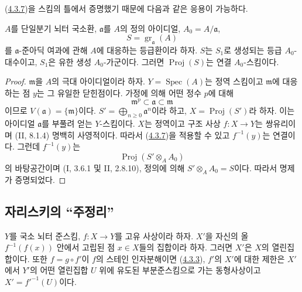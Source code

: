 (\hyperref[III.4.3.7-fr]{4.3.7})을 스킴의 틀에서 증명했기 때문에
다음과 같은 응용이 가능하다.

\begin{proposition}[4.3.13]
\label{III.4.3.13-fr}
$A$를 단일분기 뇌터 국소환, $\mathfrak a$를 $A$의 정의 아이디얼,
$A_0=A/\mathfrak a$,
\[
S=\operatorname{gr}_{\mathfrak a}(A)
\]
를 $\mathfrak a$-준아딕 여과에 관해 $A$에 대응하는 등급환이라 하자.
$S$는 $S_1$로 생성되는 등급 $A_0$-대수이고, $S_1$은 유한 생성
$A_0$-가군이다. 그러면 $\operatorname{Proj}(S)$는 연결
$A_0$-스킴이다.
\end{proposition}

\begin{proof}
$\mathfrak m$을 $A$의 극대 아이디얼이라 하자.
$Y=\operatorname{Spec}(A)$는 정역 스킴이고 $\mathfrak m$에 대응하는
점 $y$는 그 유일한 닫힌점이다. 가정에 의해 어떤 정수 $p$에 대해
\[
\mathfrak m^p\subset\mathfrak a\subset\mathfrak m
\]
이므로 $V(\mathfrak a)=\{\mathfrak m\}$이다.
$S'=\bigoplus_{n\geq0}\mathfrak a^n$이라 하고,
$X=\operatorname{Proj}(S')$라 하자. 이는 아이디얼 $\mathfrak a$를
부풀려 얻는 $Y$-스킴이다. $X$는 정역이고 구조 사상 $f:X\to Y$는
쌍유리이며 (II, 8.1.4) 명백히 사영적이다. 따라서
(\hyperref[III.4.3.7-fr]{4.3.7})을 적용할 수 있고
$f^{-1}(y)$는 연결이다. 그런데 $f^{-1}(y)$는
\[
\operatorname{Proj}(S'\otimes_AA_0)
\]
의 바탕공간이며 (I, 3.6.1 및 II, 2.8.10),
정의에 의해 $S'\otimes_AA_0=S$이다. 따라서 명제가 증명되었다.
\end{proof}

\subsection{자리스키의 “주정리”}
\label{subsection:III.4.4-fr}

\begin{proposition}[4.4.1]
\label{III.4.4.1-fr}
$Y$를 국소 뇌터 준스킴, $f:X\to Y$를 고유 사상이라 하자.
$X'$을 자신의 올 $f^{-1}(f(x))$ 안에서 고립된 점 $x\in X$들의
집합이라 하자. 그러면 $X'$은 $X$의 열린집합이다. 또한
$f=g\circ f'$이 $f$의 스테인 인자분해이면
(\hyperref[III.4.3.3-fr]{4.3.3}), $f'$의 $X'$에 대한 제한은
$X'$에서 $Y'$의 어떤 열린집합 $U$ 위에 유도된 부분준스킴으로 가는
동형사상이고 $X'=f'^{-1}(U)$이다.
\end{proposition}

